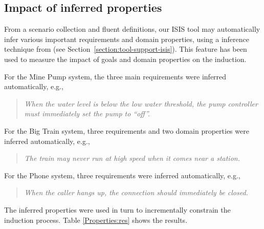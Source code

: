 
\subsection{Impact of inferred properties}

From a scenario collection and fluent definitions, our ISIS tool may automatically infer various important requirements and domain properties, using a inference technique from \cite{Damas:2006, Damas:2011} (see Section~\ref{section:tool-support-isis}). This feature has been used to measure the impact of goals and domain properties on the induction.

For the Mine Pump system, the three main requirements were inferred automatically, e.g.,
\begin{quote}
\emph{When the water level is below the low water threshold, the pump controller must immediately set the pump to “off”.}
\end{quote}

For the Big Train system, three requirements and two domain properties were inferred automatically, e.g.,
\begin{quote}
\emph{The train may never run at high speed when it comes near a station.}
\end{quote}

For the Phone system, three requirements were inferred automatically, e.g.,

\begin{quote}
\emph{When the caller hangs up, the connection should immediately be closed.}
\end{quote}

The inferred properties were used in turn to incrementally constrain the induction process. Table \ref{Properties:res} shows the results. 

